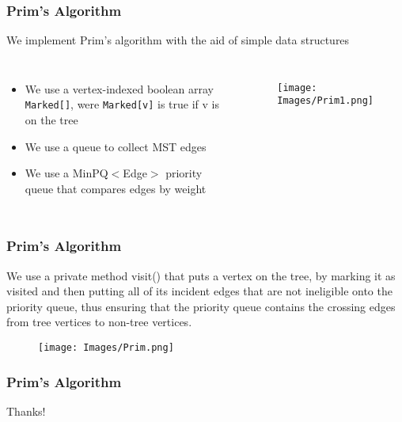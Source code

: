 \documentclass{beamer}
\begin{document}
\begin{frame}
\frametitle{Prim's Algorithm}
We implement Prim’s algorithm with the aid of simple data structures 
\begin{columns}[c] %
\begin{itemize}
\item {\footnotesize We use a vertex-indexed boolean array \texttt{Marked[]}, were \texttt{Marked[v]} is true if v is on the tree}
\item {\footnotesize We use a queue to collect MST edges}
\item {\footnotesize We use a MinPQ$<$Edge$>$ priority queue that compares edges by weight}
\end{itemize}
\begin{figure}[h]
\texttt{[image: Images/Prim1.png]}
\centering
\end{figure}
\end{columns}

\end{frame}
\begin{frame}
\frametitle{Prim's Algorithm}
{\footnotesize We use a private method visit() that puts a vertex on the tree, by marking it as visited and then putting all of its incident edges that are not ineligible onto the priority queue, thus ensuring that the priority queue contains the crossing edges from tree vertices to non-tree vertices.}
\begin{figure}[h]
\texttt{[image: Images/Prim.png]}
\centering
\end{figure}
\end{frame}
\begin{frame}
\frametitle{Prim's Algorithm}
\begin{center}
{\Huge Thanks!}
\end{center}
\end{frame}
\end{document}
